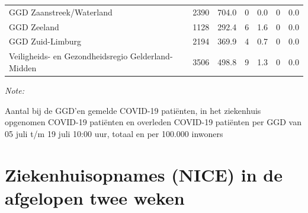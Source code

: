 \documentclass[
  english,
  man,floatsintext]{apa6}
\begin{document}
\begin{table}
\begin{threeparttable}
\begin{tabular}{lrrrrrr}
GGD Zaanstreek/Waterland & 2390 & 704.0 & 0 & 0.0 & 0 & 0.0\\
GGD Zeeland & 1128 & 292.4 & 6 & 1.6 & 0 & 0.0\\
GGD Zuid-Limburg & 2194 & 369.9 & 4 & 0.7 & 0 & 0.0\\
Veiligheids- en Gezondheidsregio Gelderland-Midden & 3506 & 498.8 & 9 & 1.3 & 0 & 0.0\\
\bottomrule
\end{tabular}
\begin{tablenotes}
\item \textit{Note: } 
\item Aantal bij de GGD’en gemelde COVID-19 patiënten, in het ziekenhuis opgenomen COVID-19 patiënten en overleden COVID-19 patiënten per GGD van 05 juli t/m 19 juli 10:00 uur, totaal en per 100.000 inwoners
\end{tablenotes}
\end{threeparttable}
\endgroup{}
\end{table}

\newpage

\hypertarget{ziekenhuisopnames-nice-in-de-afgelopen-twee-weken}{%
\section{Ziekenhuisopnames (NICE) in de afgelopen twee weken}\label{ziekenhuisopnames-nice-in-de-afgelopen-twee-weken}}
\end{document}
